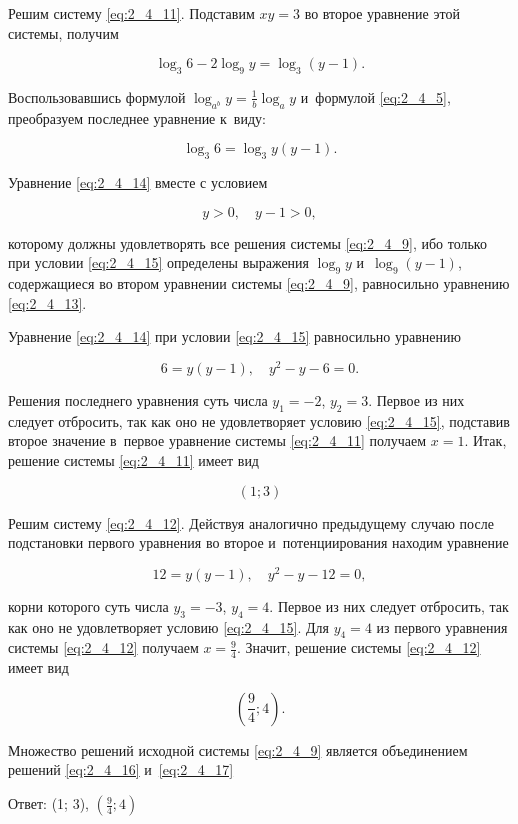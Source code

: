 Решим систему \eqref{eq:2_4_11}. Подставим $xy = 3$ во второе уравнение
этой системы, получим

\begin{equation}\label{eq:2_4_13}
\log_{3} 6 - 2 \log_{9} y = \log_{3} (y - 1).
\end{equation}

\noindent
Воспользовавшись формулой $\displaystyle \log_{a^{b}} y = \frac{1}{b} \log_{a} y$
и~формулой \eqref{eq:2_4_5}, преобразуем последнее уравнение к~виду:

\begin{equation}\label{eq:2_4_14}
\log_{3} 6 = \log_{3} y (y - 1).
\end{equation}

Уравнение \eqref{eq:2_4_14} вместе с условием

\begin{equation}\label{eq:2_4_15}
y > 0, \quad y - 1 > 0,
\end{equation}

\noindent
которому должны удовлетворять все решения системы \eqref{eq:2_4_9},
ибо только при условии \eqref{eq:2_4_15} определены выражения $\log_{9} y$
и~$\log_{9} (y - 1)$, содержащиеся во втором уравнении системы \eqref{eq:2_4_9},
равносильно уравнению \eqref{eq:2_4_13}.

Уравнение \eqref{eq:2_4_14} при условии \eqref{eq:2_4_15} равносильно уравнению

\begin{equation*}
6 = y(y - 1), \quad y^{2} - y - 6 = 0.
\end{equation*}

\noindent
Решения последнего уравнения суть числа $y_{1} = -2 $, $y_{2} = 3$.
Первое из них следует отбросить, так как оно не удовлетворяет условию \eqref{eq:2_4_15},
подставив второе значение в~первое уравнение системы \eqref{eq:2_4_11} получаем
$x = 1$. Итак, решение системы \eqref{eq:2_4_11} имеет вид

\begin{equation}\label{eq:2_4_16}
(1; 3)
\end{equation}

Решим систему \eqref{eq:2_4_12}. Действуя аналогично предыдущему случаю после
подстановки первого уравнения во второе и~потенциирования находим уравнение

\begin{equation*}
12 = y(y - 1), \quad y^{2} - y - 12 = 0,
\end{equation*}

\noindent
корни которого суть числа $y_{3} = -3$, $y_{4} = 4$.
Первое из них следует отбросить, так как оно не удовлетворяет условию \eqref{eq:2_4_15}.
Для $y_{4} = 4$ из первого уравнения системы \eqref{eq:2_4_12} получаем
$\displaystyle x = \frac{9}{4}$. Значит, решение системы \eqref{eq:2_4_12} имеет вид

\begin{equation}\label{eq:2_4_17}
\displaystyle \left(
\frac{9}{4}; 4
\right).
\end{equation}

Множество решений исходной системы \eqref{eq:2_4_9} является объединением решений
\eqref{eq:2_4_16} и~\eqref{eq:2_4_17}

Ответ: (1; 3), $\displaystyle \left( \frac{9}{4}; 4 \right)$

